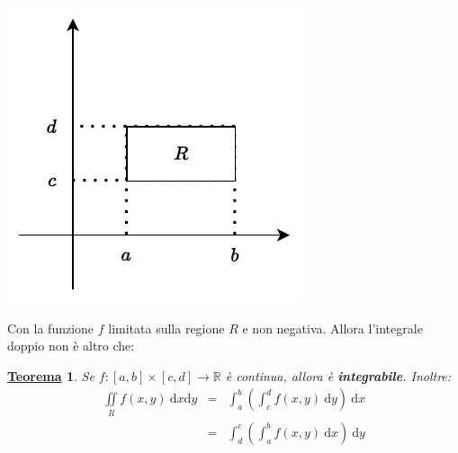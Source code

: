 \documentclass[a4paper]{article}
\newtheorem{theorem}{\textcolor{Red3}{\underline{Teorema}}}
\begin{document}
	\begin{minipage}{.5\textwidth}
		\centering
		\includegraphics[width=.8\textwidth]{img/integrali_doppi_regioni_rettangolari.pdf}
	\end{minipage}\:\newline
	
	\noindent
	Con la funzione $f$ limitata sulla regione $R$ e non negativa. Allora l'integrale doppio non è altro che:
	\begin{theorem}\label{theorem: integrale doppio su regione rettangolare}
		Se $f: \left[a,b\right] \times \left[c,d\right] \rightarrow \mathbb{R}$ è continua, allora è \textbf{integrabile}. Inoltre:
		\begin{equation}\label{eq: integrale doppio su regione rettangolare}
			\begin{array}{rcl}
				\displaystyle\iint\limits_{R} f\left(x,y\right) \: \mathrm{d}x\mathrm{d}y &=& \displaystyle\int_{a}^{b} \left(\int_{c}^{d} f\left(x,y\right) \: \mathrm{d}y \right) \: \mathrm{d}x \\ [1em]
				&=& \displaystyle\int_{d}^{c} \left(\int_{a}^{b} f\left(x,y\right) \: \mathrm{d}x \right) \: \mathrm{d}y
			\end{array}
		\end{equation}
	\end{theorem}

	\newpage
	
\end{document}
